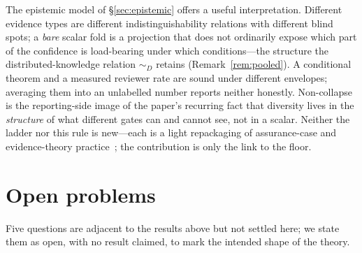 \documentclass[11pt]{article}
\theoremstyle{definition}
\theoremstyle{remark}
\begin{document}
The epistemic model of \S\ref{sec:epistemic} offers a useful interpretation. Different evidence types
are different indistinguishability relations with different blind spots; a \emph{bare} scalar fold is a
projection that does not ordinarily expose which part of the confidence is load-bearing under which
conditions---the structure the distributed-knowledge relation $\sim_D$ retains
(Remark~\ref{rem:pooled}). A conditional theorem and a measured reviewer rate are sound under different
envelopes; averaging them into an unlabelled number reports neither honestly. Non-collapse is the reporting-side image of the
paper's recurring fact that diversity lives in the \emph{structure} of what different gates can and
cannot see, not in a scalar. Neither the ladder nor this rule is new---each is a light repackaging of
assurance-case and evidence-theory practice~\cite{mankins1995,gsn,shafer1976}; the contribution is only
the link to the floor.

\section{Open problems}\label{sec:open}
Five questions are adjacent to the results above but not settled here; we state them as open, with no
result claimed, to mark the intended shape of the theory.
\end{document}

